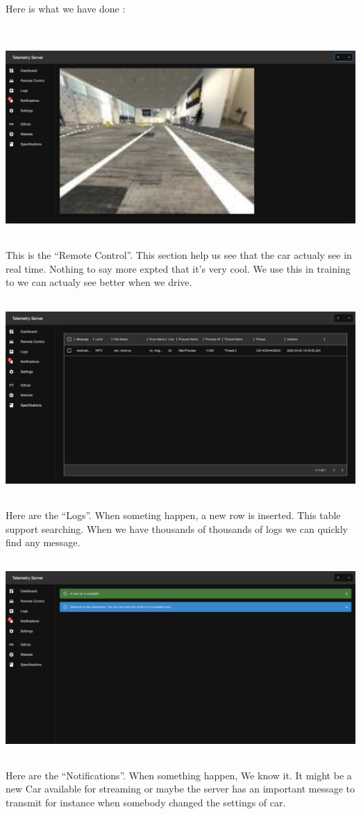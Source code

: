 \documentclass[12pt]{article}
\begin{document}
\newpage

Here is what we have done : \\ \\
\centerline{\includegraphics[height=7.5cm]{../../docs/remote-control.png}}
This is the “Remote Control”. This section help us see that the car actualy see in real time. Nothing to say more expted that it’s very cool. We use this in training to we can actualy see better when we drive. \\

\centerline{\includegraphics[height=7.5cm]{../../docs/server-logs.png}}
Here are the “Logs”. When someting happen, a new row is inserted. This table support searching. When we have thousands of thousands of logs we can quickly find any message. \\


\centerline{\includegraphics[height=7.5cm]{../../docs/notifications.png}}
Here are the “Notifications”. When something happen, We know it. It might be a new Car available for streaming or maybe the server has an important message to transmit for instance when somebody changed the settings of car.
\end{document}
